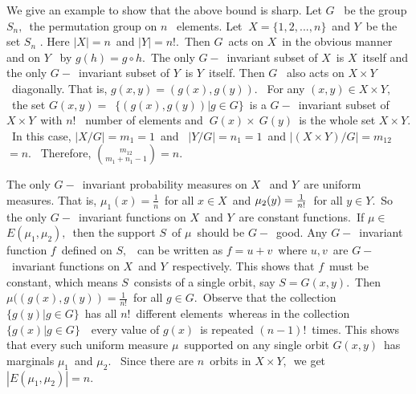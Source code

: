 \documentclass{article}
\begin{document}
{\large We give an example to show that the above bound is sharp. Let }$G$%
{\large \ be the group }$S_{n},${\large \ the permutation group on }$n$%
{\large \ elements. Let }$\ X=\{1,2,...,n\}${\large \ and }$Y${\large \ be
the set }{\large $S_{n}$ . Here $|X|=n$}{\large \ and $|Y|=n!.$}{\large \
Then }$G${\large \ acts on }$X${\large \ in the obvious manner and on }$Y$%
{\large \ by }$g(h)=g\circ h.${\large \ The only }$G-${\large \ invariant
subset of }$X${\large \ is }$X${\large \ itself and the only }$G-${\large \
invariant subset of }$Y${\large \ is }$Y${\large \ itself. Then }$G${\large %
\ also acts on }$X\times Y${\large \ diagonally. That is, }$%
g(x,y)=(g(x),g(y)).${\large \ } {\large For any }$(x,y)\in X\times Y,$%
{\large \ the set }$G(x,y)=${\large \ }$\{(g(x),g(y))|g\in G\}${\large \ is
a }$G-${\large \ invariant subset of }$X\times Y${\large \ with }$n!${\large %
\ number of elements and }$\ G(x)\times \ G(y)${\large \ is the whole set }$%
X\times Y.${\large \ In this case, }$|X/G|=m_{1}=1${\large \ and \ }$%
|Y/G|=n_{1}=1${\large \ and }$|(X\times Y)/G|=m_{12}${\large \ }$=n.${\large %
\ Therefore, }$\binom{m_{12}}{m_{1}+n_{1}-1}=n.$

{\large The only }$G-${\large \ invariant probability measures on }$X$%
{\large \ and }$Y${\large \ are uniform measures. That is, }$\mu _{1}(x)=%
\frac{1}{n}${\large \ for all }$x\in X${\large \ and }$\mu _{2}(y)=\frac{1}{%
n!}${\large \ for all }$y\in Y.${\large \ So the only }$G-${\large \
invariant functions on }$X${\large \ and }$Y${\large \ are constant
functions.\ If }$\mu \in ${\large \ }$E(\mu _{1},\mu _{2}),${\large \ then
the support }$S${\large \ of }$\mu ${\large \ should be }$G-${\large \ good.
Any }$G-${\large \ invariant function }$f${\large \ defined on }$S,${\large %
\ can be written as }$f=u+v${\large \ where }$u,v${\large \ are }$G-${\large %
\ invariant functions on }$X${\large \ and }$Y${\large \ respectively. This
shows that }$f${\large \ must be constant, which means }$S${\large \
consists of a single orbit, say }$S=G(x,y).${\large \ Then }$\mu
((g(x),g(y))=\frac{1}{n!}${\large \ for all }$g\in G.${\large \ Observe that
the collection }$\{g(y)|g\in G\}${\large \ has all }$n!${\large \ different
elements\ whereas in the collection }$\{g(x)|g\in G\}${\large \ \ every
value of }$g(x)${\large \ is repeated }$(n-1)!${\large \ times. This shows
that every such uniform measure }$\mu ${\large \ supported on any single
orbit }$G(x,y)${\large \ has marginals }$\mu _{1}${\large \ and }$\mu _{2}.$%
{\large \ Since there are }$n${\large \ orbits in }$X\times Y,${\large \ we
get }$|E(\mu _{1},\mu _{2})|=n.$
\end{document}
